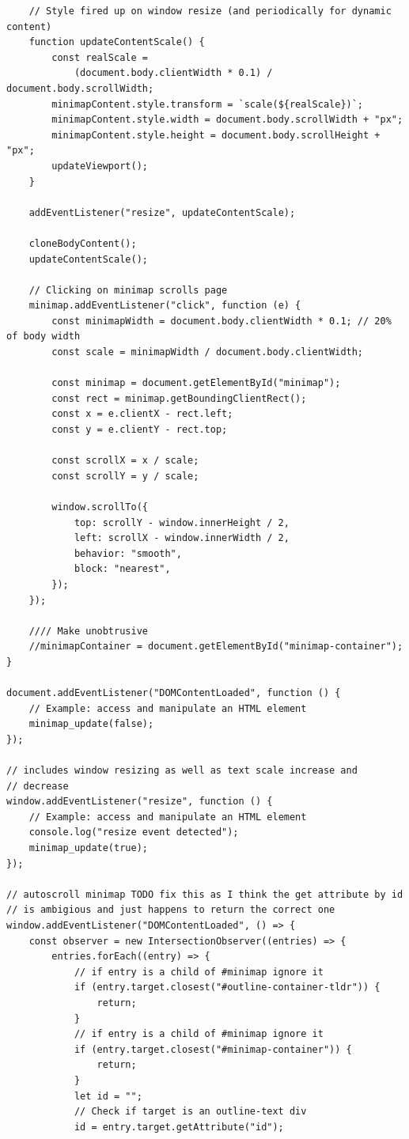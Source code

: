 \documentclass[11pt]{article}
\begin{document}
\begin{verbatim}
    // Style fired up on window resize (and periodically for dynamic content)
    function updateContentScale() {
        const realScale =
            (document.body.clientWidth * 0.1) / document.body.scrollWidth;
        minimapContent.style.transform = `scale(${realScale})`;
        minimapContent.style.width = document.body.scrollWidth + "px";
        minimapContent.style.height = document.body.scrollHeight + "px";
        updateViewport();
    }

    addEventListener("resize", updateContentScale);

    cloneBodyContent();
    updateContentScale();

    // Clicking on minimap scrolls page
    minimap.addEventListener("click", function (e) {
        const minimapWidth = document.body.clientWidth * 0.1; // 20% of body width
        const scale = minimapWidth / document.body.clientWidth;

        const minimap = document.getElementById("minimap");
        const rect = minimap.getBoundingClientRect();
        const x = e.clientX - rect.left;
        const y = e.clientY - rect.top;

        const scrollX = x / scale;
        const scrollY = y / scale;

        window.scrollTo({
            top: scrollY - window.innerHeight / 2,
            left: scrollX - window.innerWidth / 2,
            behavior: "smooth",
            block: "nearest",
        });
    });

    //// Make unobtrusive
    //minimapContainer = document.getElementById("minimap-container");
}

document.addEventListener("DOMContentLoaded", function () {
    // Example: access and manipulate an HTML element
    minimap_update(false);
});

// includes window resizing as well as text scale increase and
// decrease
window.addEventListener("resize", function () {
    // Example: access and manipulate an HTML element
    console.log("resize event detected");
    minimap_update(true);
});

// autoscroll minimap TODO fix this as I think the get attribute by id
// is ambigious and just happens to return the correct one
window.addEventListener("DOMContentLoaded", () => {
    const observer = new IntersectionObserver((entries) => {
        entries.forEach((entry) => {
            // if entry is a child of #minimap ignore it
            if (entry.target.closest("#outline-container-tldr")) {
                return;
            }
            // if entry is a child of #minimap ignore it
            if (entry.target.closest("#minimap-container")) {
                return;
            }
            let id = "";
            // Check if target is an outline-text div
            id = entry.target.getAttribute("id");


\end{verbatim}
\end{document}
